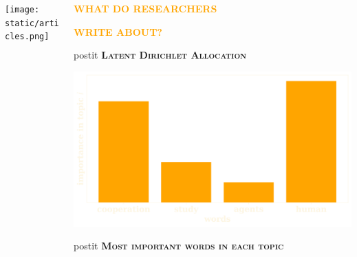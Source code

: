\documentclass[usenames,dvipsnames,t]{beamer}
\newcommand*\circled[1]{\tikz[baseline=(char.base)]{
            \node[shape=circle,draw,inner sep=2pt] (char) {#1};}}
\begin{document}
\begin{columns}
\begin{column}{.33\linewidth}
\begin{center}
        \vspace{-.9cm}
        \texttt{[image: static/articles.png]}
    \end{center}
\end{column}
\vrule width 3pt
\begin{column}{.33\linewidth}
    \begin{center}
        \textbf{\Large\textcolor{orange}{\circled{2} \textsc{WHAT DO RESEARCHERS}}}
        \vspace{.5cm}
    
        \textbf{\Large\textcolor{orange}{\textsc{WRITE ABOUT?}}}
    \end{center}
    \vspace{1cm}
    \centering
    \begin{minipage}{4cm}
        \begin{beamercolorbox}[ht=.7cm, sep=.2em, wd=9.3cm, rounded=true]{postit}
        \textcolor{solarizedBase03}{\small
         \textbf{\textsc{Latent Dirichlet Allocation}}}
        \end{beamercolorbox}
    \end{minipage}

    \begin{center}
        \includegraphics[width=.45\textwidth]{static/lda}
    \end{center}

    \begin{center}
        \begin{minipage}{4cm}
            \begin{beamercolorbox}[ht=.7cm, sep=.1em, wd=12cm, rounded=true]{postit}
            \textcolor{solarizedBase03}{\small
             \textbf{\textsc{Most important words in each topic}}}
            \end{beamercolorbox}
        \end{minipage}
        \vspace{.7cm}


\end{center}
\end{column}
\end{columns}
\end{document}
